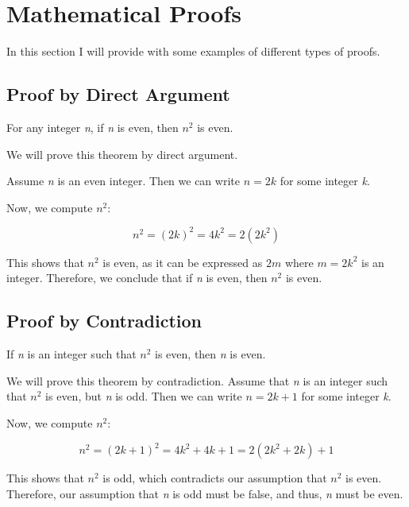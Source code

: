 \newpage
\section{Mathematical Proofs}

In this section I will provide with some examples of different types of proofs.

\subsection{Proof by Direct Argument}

For any integer \emph{n}, if \emph{n} is even, then \( n^2 \) is even.
\vspace{\baselineskip}

We will prove this theorem by direct argument.
\vspace{\baselineskip}

Assume \emph{n} is an even integer. Then we can write \( n = 2k \) for some integer \emph{k}.
\vspace{\baselineskip}

Now, we compute \( n^2 \):

\[		
	n^2 = {(2k)}^2 = 4k^2 = 2(2k^2)
\]
	
This shows that \( n^2 \) is even, as it can be expressed as \( 2m \) where \( m = 2k^2 \) is an integer.
Therefore, we conclude that if \emph{n} is even, then \( n^2 \) is even.

\QED

\subsection{Proof by Contradiction}

If \emph{n} is an integer such that \( n^2 \) is even, then \emph{n} is even.
\vspace{\baselineskip}

We will prove this theorem by contradiction. Assume that \emph{n} is an integer such that \( n^2 \) is 
even, but \emph{n} is odd. Then we can write \( n = 2k + 1 \) for some integer \emph{k}.
\vspace{\baselineskip}

Now, we compute \( n^2 \):

\[
	n^2 = {(2k + 1)}^2 = 4k^2 + 4k + 1 = 2(2k^2 + 2k) + 1
\]
	
This shows that \( n^2 \) is odd, which contradicts our assumption that \( n^2 \) is even. Therefore, our 
assumption that \emph{n} is odd must be false, and thus, \emph{n} must be even.

